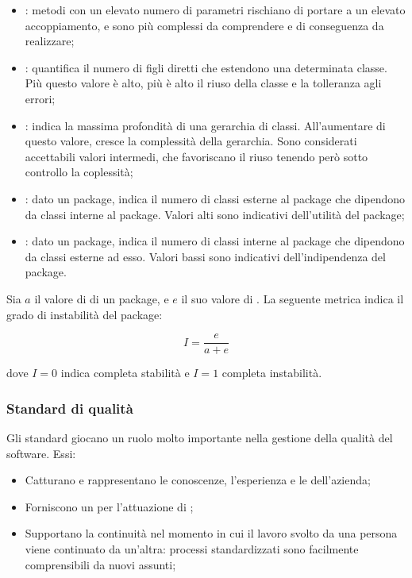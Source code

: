 \begin{itemize}
  \item {}: metodi con un elevato numero di parametri
    rischiano di portare a un elevato accoppiamento, e sono più complessi da
    comprendere e di conseguenza da realizzare;
  \item {}: quantifica il numero di figli diretti
    che estendono una determinata classe. Più questo valore è alto, più è alto il
    riuso della classe e la tolleranza agli errori;
  \item {}: indica la massima profondità
    di una gerarchia di classi. All'aumentare di questo valore, cresce la
    complessità della gerarchia. Sono considerati accettabili valori intermedi,
    che favoriscano il riuso tenendo però sotto controllo la coplessità;
  \item {}: dato un package, indica il numero
    di classi esterne al package che dipendono da classi interne al package.
    Valori alti sono indicativi dell'utilità del package;
  \item {}: dato un package, indica il numero
    di classi interne al package che dipendono da classi esterne ad esso. Valori
    bassi sono indicativi dell'indipendenza del package.
\end{itemize}

Sia $a$ il valore di  di un package, e $e$ il suo
valore di . La seguente metrica indica il grado di
instabilità del package:

\[
    I = \frac{e}{a + e}
\]

dove $I = 0$ indica completa stabilità e $I = 1$ completa instabilità.

\subsubsection{Standard di qualità}

Gli standard giocano un ruolo molto importante nella gestione della qualità del
software. Essi:

\begin{itemize}
  \item Catturano e rappresentano le conoscenze, l'esperienza e le
     dell'azienda;
  \item Forniscono un  per l'attuazione di ;
  \item Supportano la continuità nel momento in cui il lavoro svolto da una
    persona viene continuato da un'altra: processi standardizzati sono
    facilmente comprensibili da nuovi assunti;
\end{itemize}

